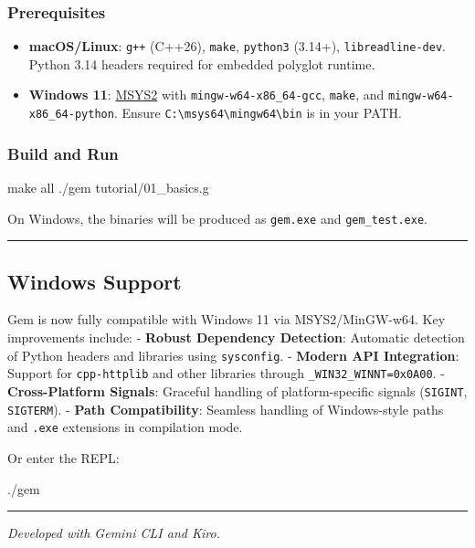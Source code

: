 \documentclass[
]{article}
\newenvironment{Shaded}{}{}
\newcommand{\ExtensionTok}[1]{#1}
\newcommand{\FunctionTok}[1]{\textcolor[rgb]{0.02,0.16,0.49}{#1}}
\newcommand{\NormalTok}[1]{#1}
\providecommand{\tightlist}{%
  \setlength{\itemsep}{0pt}\setlength{\parskip}{0pt}}
\begin{document}
\subsubsection{Prerequisites}\label{prerequisites}

\begin{itemize}
\tightlist
\item
  \textbf{macOS/Linux}: \texttt{g++} (C++26), \texttt{make},
  \texttt{python3} (3.14+), \texttt{libreadline-dev}. Python 3.14
  headers required for embedded polyglot runtime.
\item
  \textbf{Windows 11}: \href{https://www.msys2.org/}{MSYS2} with
  \texttt{mingw-w64-x86\_64-gcc}, \texttt{make}, and
  \texttt{mingw-w64-x86\_64-python}. Ensure
  \texttt{C:\textbackslash{}msys64\textbackslash{}mingw64\textbackslash{}bin}
  is in your PATH.
\end{itemize}

\subsubsection{Build and Run}\label{build-and-run}

\begin{Shaded}
\begin{Highlighting}[]
\FunctionTok{make}\NormalTok{ all}
\ExtensionTok{./gem}\NormalTok{ tutorial/01\_basics.g}
\end{Highlighting}
\end{Shaded}

On Windows, the binaries will be produced as \texttt{gem.exe} and
\texttt{gem\_test.exe}.

\begin{center}\rule{0.5\linewidth}{0.5pt}\end{center}

\subsection{Windows Support}\label{windows-support}

Gem is now fully compatible with Windows 11 via MSYS2/MinGW-w64. Key
improvements include: - \textbf{Robust Dependency Detection}: Automatic
detection of Python headers and libraries using \texttt{sysconfig}. -
\textbf{Modern API Integration}: Support for \texttt{cpp-httplib} and
other libraries through \texttt{\_WIN32\_WINNT=0x0A00}. -
\textbf{Cross-Platform Signals}: Graceful handling of platform-specific
signals (\texttt{SIGINT}, \texttt{SIGTERM}). - \textbf{Path
Compatibility}: Seamless handling of Windows-style paths and
\texttt{.exe} extensions in compilation mode.

Or enter the REPL:

\begin{Shaded}
\begin{Highlighting}[]
\ExtensionTok{./gem}
\end{Highlighting}
\end{Shaded}

\begin{center}\rule{0.5\linewidth}{0.5pt}\end{center}

\emph{Developed with Gemini CLI and Kiro.}
\end{document}
